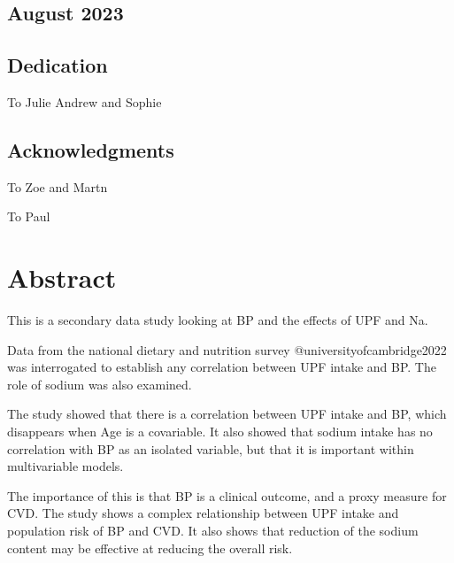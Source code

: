 \documentclass[
]{article}
\begin{document}
\hypertarget{august-2023}{%
\subsection*{August 2023}\label{august-2023}}

\newpage

\hypertarget{dedication}{%
\subsection*{Dedication}\label{dedication}}

To Julie Andrew and Sophie

\newpage

\hypertarget{acknowledgments}{%
\subsection*{Acknowledgments}\label{acknowledgments}}

To Zoe and Martn

To Paul

\newpage

\newpage

\hypertarget{abstract}{%
\section*{Abstract}\label{abstract}}

This is a secondary data study looking at BP and the effects of UPF and
Na.

Data from the national dietary and nutrition survey
@universityofcambridge2022 was interrogated to establish any correlation
between UPF intake and BP. The role of sodium was also examined.

The study showed that there is a correlation between UPF intake and BP,
which disappears when Age is a covariable. It also showed that sodium
intake has no correlation with BP as an isolated variable, but that it
is important within multivariable models.

The importance of this is that BP is a clinical outcome, and a proxy
measure for CVD. The study shows a complex relationship between UPF
intake and population risk of BP and CVD. It also shows that reduction
of the sodium content may be effective at reducing the overall risk.
\end{document}
